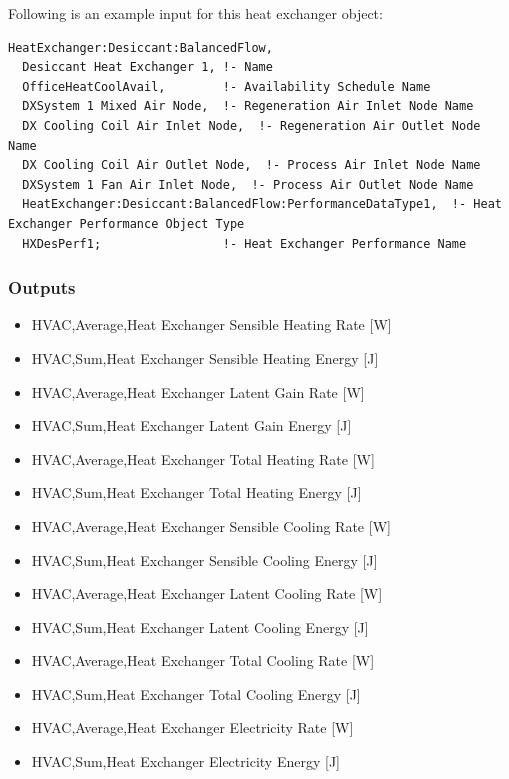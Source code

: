 Following is an example input for this heat exchanger object:

\begin{lstlisting}
HeatExchanger:Desiccant:BalancedFlow,
  Desiccant Heat Exchanger 1, !- Name
  OfficeHeatCoolAvail,        !- Availability Schedule Name
  DXSystem 1 Mixed Air Node,  !- Regeneration Air Inlet Node Name
  DX Cooling Coil Air Inlet Node,  !- Regeneration Air Outlet Node Name
  DX Cooling Coil Air Outlet Node,  !- Process Air Inlet Node Name
  DXSystem 1 Fan Air Inlet Node,  !- Process Air Outlet Node Name
  HeatExchanger:Desiccant:BalancedFlow:PerformanceDataType1,  !- Heat Exchanger Performance Object Type
  HXDesPerf1;                 !- Heat Exchanger Performance Name
\end{lstlisting}

\subsubsection{Outputs}\label{outputs-2-010}

\begin{itemize}
\item
  HVAC,Average,Heat Exchanger Sensible Heating Rate {[}W{]}
\item
  HVAC,Sum,Heat Exchanger Sensible Heating Energy {[}J{]}
\item
  HVAC,Average,Heat Exchanger Latent Gain Rate {[}W{]}
\item
  HVAC,Sum,Heat Exchanger Latent Gain Energy {[}J{]}
\item
  HVAC,Average,Heat Exchanger Total Heating Rate {[}W{]}
\item
  HVAC,Sum,Heat Exchanger Total Heating Energy {[}J{]}
\item
  HVAC,Average,Heat Exchanger Sensible Cooling Rate {[}W{]}
\item
  HVAC,Sum,Heat Exchanger Sensible Cooling Energy {[}J{]}
\item
  HVAC,Average,Heat Exchanger Latent Cooling Rate {[}W{]}
\item
  HVAC,Sum,Heat Exchanger Latent Cooling Energy {[}J{]}
\item
  HVAC,Average,Heat Exchanger Total Cooling Rate {[}W{]}
\item
  HVAC,Sum,Heat Exchanger Total Cooling Energy {[}J{]}
\item
  HVAC,Average,Heat Exchanger Electricity Rate {[}W{]}
\item
  HVAC,Sum,Heat Exchanger Electricity Energy {[}J{]}
\end{itemize}

